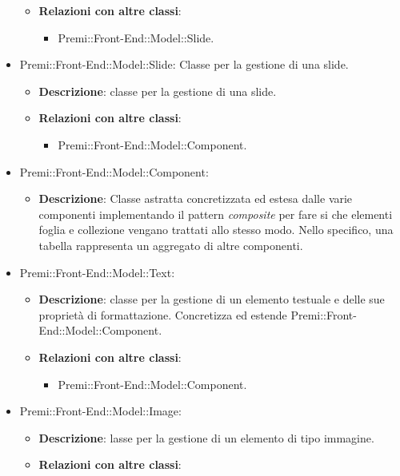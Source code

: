 \begin{itemize}
\begin{itemize}
				\item \textbf{Relazioni con altre classi}:
				\begin{itemize}
					\item Premi::Front-End::Model::Slide.
				\end{itemize}
			\end{itemize}
		 \item Premi::Front-End::Model::Slide: Classe per la gestione di una slide.
			\begin{itemize}
				\item \textbf{Descrizione}: classe per la gestione di una slide.
				\item \textbf{Relazioni con altre classi}:
				\begin{itemize}
					\item Premi::Front-End::Model::Component.
				\end{itemize}
			\end{itemize}
		 \item  Premi::Front-End::Model::Component: 
			\begin{itemize}
				\item \textbf{Descrizione}: Classe astratta concretizzata ed estesa dalle varie componenti implementando il pattern \textit{composite} per fare si che elementi foglia e collezione vengano trattati allo stesso modo. Nello specifico, una tabella rappresenta un aggregato di altre componenti.
			\end{itemize}
		 \item  Premi::Front-End::Model::Text:
			\begin{itemize}
				\item \textbf{Descrizione}: classe per la gestione di un elemento testuale e delle sue proprietà di formattazione. Concretizza ed estende Premi::Front-End::Model::Component.
				\item \textbf{Relazioni con altre classi}:
				\begin{itemize}
					\item Premi::Front-End::Model::Component.
				\end{itemize}
			\end{itemize}
		 \item  Premi::Front-End::Model::Image:
			\begin{itemize}
				\item \textbf{Descrizione}: lasse per la gestione di un elemento di tipo immagine.
				\item \textbf{Relazioni con altre classi}:
				\begin{itemize}

\end{itemize}
\end{itemize}
\end{itemize}
